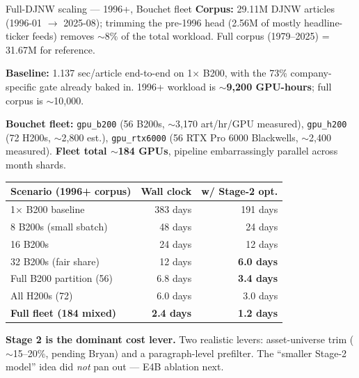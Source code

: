 \documentclass[10pt,aspectratio=169]{beamer}
\begin{document}
\begin{frame}{Full-DJNW scaling --- 1996+, Bouchet fleet}
  \scriptsize
  \textbf{Corpus:} 29.11M DJNW articles (1996-01 $\rightarrow$ 2025-08); trimming the pre-1996
  head (2.56M of mostly headline-ticker feeds) removes $\sim$8\% of the total workload. Full
  corpus (1979--2025) = 31.67M for reference.

  \vspace{0.3em}
  \textbf{Baseline:} 1.137 sec/article end-to-end on 1$\times$ B200, with the 73\%
  company-specific gate already baked in. 1996+ workload is
  \textbf{$\sim$9{,}200 GPU-hours}; full corpus is $\sim$10{,}000.

  \vspace{0.3em}
  \textbf{Bouchet fleet:} \texttt{gpu\_b200} (56 B200s, $\sim$3{,}170 art/hr/GPU measured),
  \texttt{gpu\_h200} (72 H200s, $\sim$2{,}800 est.), \texttt{gpu\_rtx6000}
  (56 RTX Pro 6000 Blackwells, $\sim$2{,}400 measured). \textbf{Fleet total $\sim$184 GPUs},
  pipeline embarrassingly parallel across month shards.

  \vspace{0.3em}
  \centering
  \setlength{\tabcolsep}{8pt}
  \renewcommand{\arraystretch}{1.1}
  \begin{tabular}{lrr}
    \toprule
    \textbf{Scenario (1996+ corpus)} & \textbf{Wall clock} & \textbf{w/ Stage-2 opt.} \\
    \midrule
    1$\times$ B200 baseline          & 383 days & 191 days \\
    8 B200s (small sbatch)           &  48 days &  24 days \\
    16 B200s                         &  24 days &  12 days \\
    32 B200s (fair share)            &  12 days & \textbf{6.0 days} \\
    Full B200 partition (56)         & 6.8 days & \textbf{3.4 days} \\
    All H200s (72)                   & 6.0 days & 3.0 days \\
    \textbf{Full fleet (184 mixed)}  & \textbf{2.4 days} & \textbf{1.2 days} \\
    \bottomrule
  \end{tabular}

  \vspace{0.2em}
  \raggedright
  \textcolor{goodgreen}{\textbf{Stage 2 is the dominant cost lever.}} Two realistic levers:
  asset-universe trim ($\sim$15--20\%, pending Bryan) and a paragraph-level prefilter. The
  ``smaller Stage-2 model'' idea did \emph{not} pan out --- E4B ablation next.
\end{frame}
\end{document}
